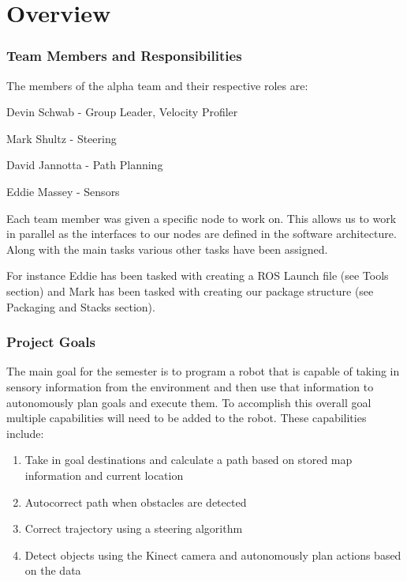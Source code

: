 \part{Overview}

\section{Team Members and Responsibilities}

The members of the alpha team and their respective roles are:

Devin Schwab - Group Leader, Velocity Profiler

Mark Shultz - Steering

David Jannotta - Path Planning

Eddie Massey - Sensors

Each team member was given a specific node to work on.  This allows us
to work in parallel as the interfaces to our nodes are defined in the
software architecture. Along with the main tasks various other tasks
have been assigned.

For instance Eddie has been tasked with creating a ROS Launch file
(see Tools section) and Mark has been tasked with creating our package
structure (see Packaging and Stacks section).


\section{Project Goals}
The main goal for the semester is to program a robot that is capable
of taking in sensory information from the environment and then use
that information to autonomously plan goals and execute them.  To
accomplish this overall goal multiple capabilities will need to be
added to the robot.  These capabilities include:

\begin{enumerate}
\item Take in goal destinations and calculate a path based on stored
  map information and current location
\item Autocorrect path when obstacles are detected
\item Correct trajectory using a steering algorithm
\item Detect objects using the Kinect camera and autonomously plan
  actions based on the data
\end{enumerate}

